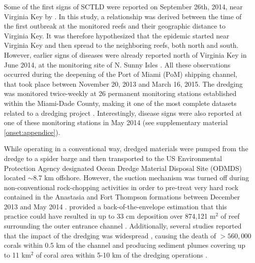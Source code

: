 \documentclass[preprint,12pt,authoryear]{elsarticle}
\begin{document}
Some of the first signs of SCTLD were reported on September 26th, 2014, near Virginia Key by \cite{precht2016unprecedented}. In this study, a relationship was derived between the time of the first outbreak at the monitored reefs and their geographic distance to Virginia Key. It was therefore hypothesized that the epidemic started near Virginia Key and then spread to the neighboring reefs, both north and south. However, earlier signs of diseases were already reported north of Virginia Key in June 2014, at the monitoring site of N. Sunny Isles \citep{precht2016unprecedented}. All these observations occurred during the deepening of the Port of Miami (PoM) shipping channel, that took place between November 20, 2013 and March 16, 2015. The dredging was monitored twice-weekly at 26 permanent monitoring stations established within the Miami-Dade County, making it one of the most complete datasets related to a dredging project \citep{gintert2019regional}. Interestingly, disease signs were also reported at one of these monitoring stations in May 2014 (see supplementary material \ref{onset:appendice}).

While operating in a conventional way, dredged materials were pumped from the dredge to a spider barge and then transported to the US Environmental Protection Agency designated Ocean Dredge Material Disposal Site (ODMDS) located $\sim$8.7 km offshore. However, the suction mechanism was turned off during non-conventional rock-chopping activities in order to pre-treat very hard rock contained in the Anastasia and Fort Thompson formations between December 2013 and May 2014 \citep{miller2016detecting}. \cite{usace2017} provided a back-of-the-envelope estimation that this practice could have resulted in up to 33 cm deposition over 874,121 m$^2$ of reef surrounding the outer entrance channel . Additionally, several studies reported that the impact of the dredging was widespread \citep{miller2016detecting}, causing the death of  $> 560,000$ corals within 0.5 km of the channel \citep{cunning2019extensive} and producing sediment plumes covering up to 11 km$^2$ of coral area within 5-10 km of the dredging operations \citep{barnes2015sediment}.
\end{document}
